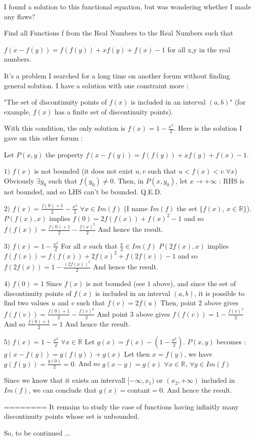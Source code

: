\begin{solution}
	\begin{tcolorbox}I found a solution to this functional equation, but was wondering whether I made any flaws?

Find all Functions f from the Real Numbers to the Real Numbers such that

$ f(x - f(y)) = f(f(y)) + xf(y) + f(x) - 1$ for all x,y in the real numbers.

\end{tcolorbox}

It's a problem I searched for a long time on another forum without finding general solution. I have a solution with one constraint more :

"The set of discontinuity points of $ f(x)$ is included in an interval $ (a,b)$" (for example, $ f(x)$ has a finite set of discontinuity points).

With this condition, the only solution is $ f(x)=1-\frac{x^2}{2}$. Here is the solution I gave on this other forum :

Let $ P(x,y)$ the property $ f(x-f(y)) = f(f(y)) + xf(y) + f(x) - 1$.

$ 1)$ $ f(x)$ is not bounded (it does not exist $ u,v$ such that $ u<f(x)<v$ $ \forall x$)
Obviously $ \exists y_0$ such that $ f(y_0)\neq 0$.
Then, in $ P(x,y_0)$, let $ x\rightarrow+\infty$ : RHS is not bounded, and so LHS can't be bounded. Q.E.D.

$ 2)$ $ f(x) = \frac{f(0)+1}{2} - \frac{x^2}{2}$ $ \forall x\in Im(f)$ (I name $ Im(f)$ the set $ \{f(x)$, $ x\in\mathbb{R}\}$).
$ P(f(x),x)$ implies $ f(0) = 2f(f(x)) + f(x)^2 - 1$ and so 
$ f(f(x))= \frac{f(0)+1}{2} - \frac{f(x)^2}{2}$
And hence the result.

$ 3)$ $ f(x) = 1 - \frac{x^2}{2}$ For all $ x$ such that $ \frac{x}{2}\in Im(f)$
$ P(2f(x),x)$ implies $ f(f(x)) = f(f(x)) + 2f(x)^2 + f(2f(x)) - 1$ and so
$ f(2f(x)) = 1 - \frac{(2f(x))^2}{2}$
And hence the result.

$ 4)$ $ f(0)=1$
Since $ f(x)$ is not bounded (see $ 1$ above), and since the set of discontinuity points of $ f(x)$ is included in an interval $ (a,b)$, it is possible to find two values $ u$ and $ v$ such that $ f(v)=2f(u)$
Then, point 2 above gives $ f(f(v)) = \frac{f(0)+1}{2} - \frac{f(v)^2}{2}$
And point 3 above gives $ f(f(v)) = 1 - \frac{f(v)^2}{2}$
And so $ \frac{f(0)+1}{2}= 1$
And hence the result.

$ 5)$ $ f(x) = 1 - \frac{x^2}{2}$ $ \forall x\in\mathbb{R}$
Let $ g(x) = f(x) - (1 - \frac{x^2}{2})$. $ P(x,y)$ becomes : $ g(x-f(y)) = g(f(y))+ g(x)$
Let then $ x=f(y)$, we have $ g(f(y))=\frac{g(0)}{2} = 0$. And so
$ g(x - y) = g(x)$ $ \forall x\in\mathbb{R}$, $ \forall y\in Im(f)$

Since we know that it exists an intervall $ [-\infty,x_1)$ or $ (x_2,+\infty)$ included in $ Im(f)$, we can conclude that $ g(x)=$contant$ =0$.
And hence the result.

========
It remains to study the case of functions having infinitly many discontinuity points whose set is unbounded.

So, to be continued ...
\end{solution}
